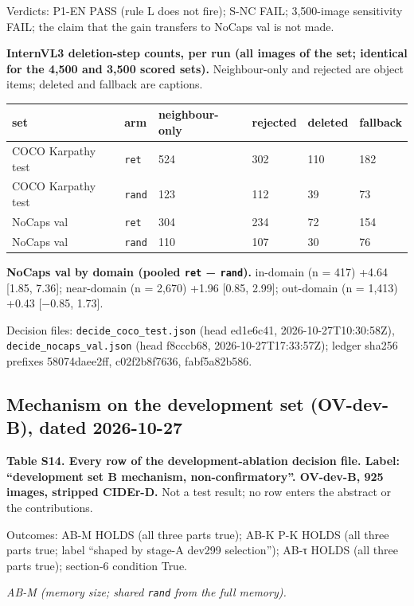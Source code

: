 \documentclass[manuscript,screen]{acmart}
\begin{document}
Verdicts: P1-EN PASS (rule L does not fire); S-NC FAIL; 3,500-image sensitivity FAIL; the claim that
the gain transfers to NoCaps val is not made.

\textbf{InternVL3 deletion-step counts, per run (all images of the set; identical for the 4,500 and
3,500 scored sets).} Neighbour-only and rejected are object items; deleted and fallback are
captions.

\begin{longtable}[]{@{}llllll@{}}
\toprule\noalign{}
set & arm & neighbour-only & rejected & deleted & fallback \\
\midrule\noalign{}
\endhead
\bottomrule\noalign{}
\endlastfoot
COCO Karpathy test & \texttt{ret} & 524 & 302 & 110 & 182 \\
COCO Karpathy test & \texttt{rand} & 123 & 112 & 39 & 73 \\
NoCaps val & \texttt{ret} & 304 & 234 & 72 & 154 \\
NoCaps val & \texttt{rand} & 110 & 107 & 30 & 76 \\
\end{longtable}

\textbf{NoCaps val by domain (pooled \texttt{ret} − \texttt{rand}).} in-domain (n = 417) +4.64
{[}1.85, 7.36{]}; near-domain (n = 2,670) +1.96 {[}0.85, 2.99{]}; out-domain (n = 1,413) +0.43
{[}−0.85, 1.73{]}.

Decision files: \texttt{decide\_\allowbreak{}coco\_\allowbreak{}test.json} (head ed1e6c41, 2026-10-27T10:30:58Z),
\texttt{decide\_\allowbreak{}nocaps\_\allowbreak{}val.json} (head f8cccb68, 2026-10-27T17:33:57Z); ledger sha256 prefixes
58074daee2ff, c02f2b8f7636, fabf5a82b586.

\subsection{Mechanism on the development set (OV-dev-B), dated
2026-10-27}\label{mechanism-on-the-development-set-ov-dev-b-dated-2026-10-27}

\textbf{Table S14. Every row of the development-ablation decision file. Label: ``development set B
mechanism, non-confirmatory''. OV-dev-B, 925 images, stripped CIDEr-D.} Not a test result; no row
enters the abstract or the contributions.

Outcomes: AB-M HOLDS (all three parts true); AB-K P-K HOLDS (all three parts true; label ``shaped by
stage-A dev299 selection''); AB-τ HOLDS (all three parts true); section-6 condition True.

\emph{AB-M (memory size; shared \texttt{rand} from the full memory).}
\end{document}
